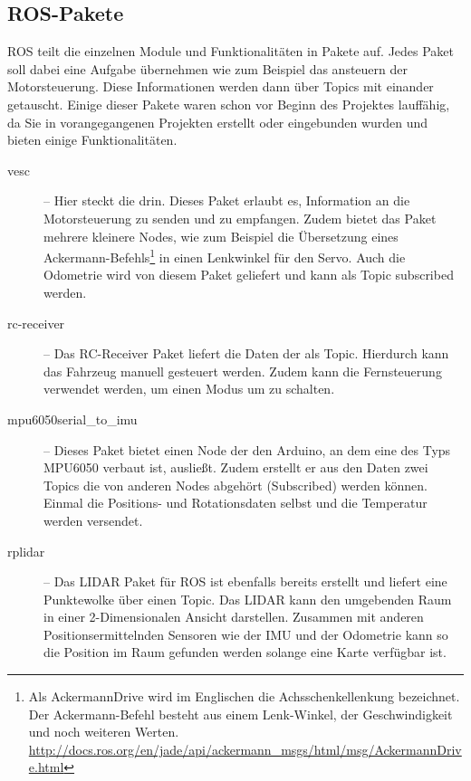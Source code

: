 \subsection{ ROS-Pakete }
\label{sec:ROS-Pakete}
ROS teilt die einzelnen Module und Funktionalitäten in Pakete auf. Jedes Paket soll dabei eine Aufgabe übernehmen wie zum Beispiel das ansteuern der Motorsteuerung. Diese Informationen werden dann über Topics mit einander getauscht. 
Einige dieser Pakete waren schon vor Beginn des Projektes lauffähig, da Sie in vorangegangenen Projekten erstellt oder eingebunden wurden und bieten einige Funktionalitäten. 

\begin{description}
    \item [vesc] 
    -- Hier steckt die  drin. Dieses Paket erlaubt es, Information an die Motorsteuerung zu senden und zu empfangen. Zudem bietet das Paket mehrere kleinere Nodes, wie zum Beispiel die Übersetzung eines Ackermann-Befehls\footnote{Als AckermannDrive wird im Englischen die Achsschenkellenkung bezeichnet. Der Ackermann-Befehl besteht aus einem Lenk-Winkel, der Geschwindigkeit und noch weiteren Werten. \url{http://docs.ros.org/en/jade/api/ackermann_msgs/html/msg/AckermannDrive.html}} in einen Lenkwinkel für den Servo. Auch die Odometrie wird von diesem Paket geliefert und kann als Topic subscribed werden.
    \item [rc-receiver] 
    -- Das RC-Receiver Paket liefert die Daten der  als Topic. Hierdurch kann das Fahrzeug manuell gesteuert werden. Zudem kann die Fernsteuerung verwendet werden, um einen Modus um zu schalten. 
    \item [mpu6050serial\_to\_imu] 
    \label{item:mpu6050}
    -- Dieses Paket bietet einen Node der den Arduino, an dem eine  des Typs MPU6050 verbaut ist, ausließt. Zudem erstellt er aus den Daten zwei Topics die von anderen Nodes abgehört (Subscribed) werden können. Einmal die Positions- und Rotationsdaten selbst und die Temperatur werden versendet.
    \item [rplidar] 
    -- Das LIDAR Paket für ROS ist ebenfalls bereits erstellt und liefert eine Punktewolke über einen Topic. Das LIDAR kann den umgebenden Raum in einer 2-Dimensionalen Ansicht darstellen. Zusammen mit anderen Positionsermittelnden Sensoren wie der IMU und der Odometrie kann so die Position im Raum gefunden werden solange eine Karte verfügbar ist.
\end{description}

